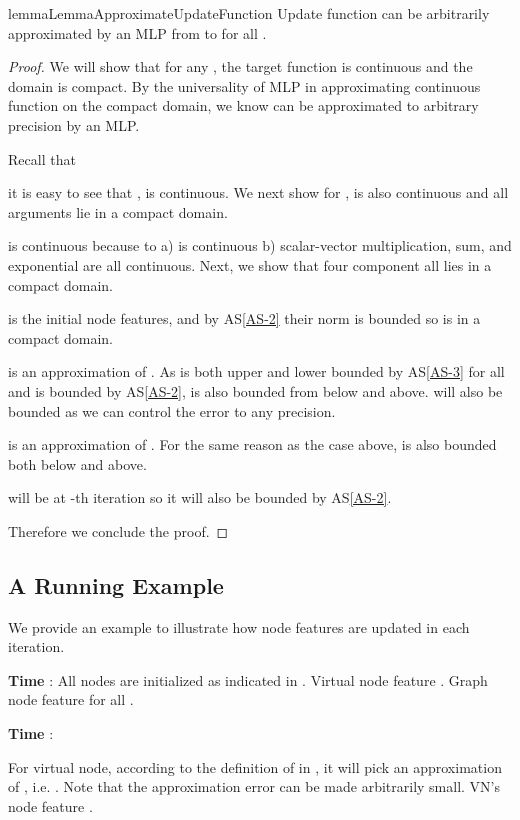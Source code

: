 \documentclass[nohyperref]{article}
\theoremstyle{plain}
\theoremstyle{definition}
\theoremstyle{remark}
\begin{document}
\begin{restatable}{lemma}{LemmaApproximateUpdateFunction}
\label{lemma-approximate-update-function}
Update function  can be arbitrarily approximated by an MLP from  to  for all .
\end{restatable}
\begin{proof}
We will show that for any , the target function
 is continuous and the domain is compact. By the universality of MLP in approximating continuous function on the compact domain, we know  can be approximated to arbitrary precision by an MLP. 

Recall that

it is easy to see that ,  is continuous. We next show for ,  is also continuous and all arguments lie in a compact domain. 

 is continuous because to a)  is continuous b) scalar-vector multiplication, sum, and exponential are all continuous. Next, we show that four component  all lies in a compact domain.

 is the initial node features, and by AS\ref{AS-2} their norm is bounded so  is in a compact domain.

 is an approximation of . As  is both upper and lower bounded by AS\ref{AS-3} for all  and  is bounded by AS\ref{AS-2},  is also bounded from below and above.  will also be bounded as we can control the error to any precision. 

 is an approximation of . For the same reason as the case above,  is also bounded both below and above.

 will be  at -th iteration so it will also be bounded by AS\ref{AS-2}.

Therefore we conclude the proof. 
\end{proof}



\subsection{A Running Example}
\label{subsec-a-running-example}
We provide an example to illustrate how node features are updated in each iteration. 

\textbf{Time }: 
All nodes are initialized as indicated in . Virtual node feature  . Graph node feature  for all .

\textbf{Time }:

For virtual node, according to the definition of  in , it will pick an approximation of , i.e. . Note that the approximation error can be made arbitrarily small. VN's node feature . 
\end{document}
